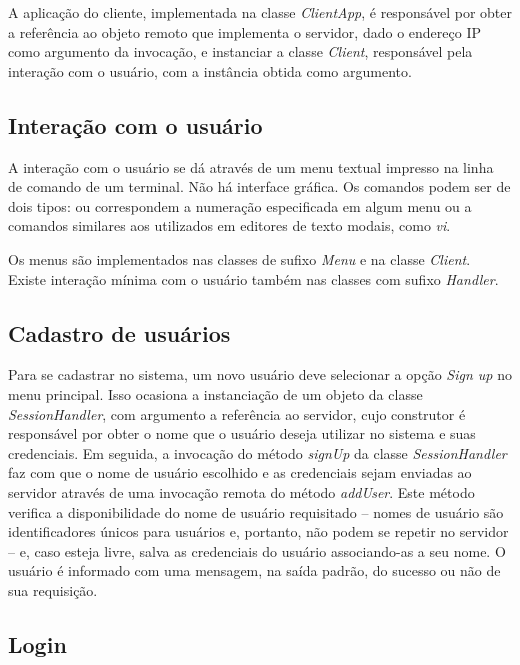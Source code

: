 \documentclass[../main.tex]{subfiles}
\begin{document}
A aplicação do cliente, implementada na classe \textit{ClientApp}, é responsável por obter a referência ao objeto remoto que implementa o servidor, dado o endereço IP como argumento da invocação, e instanciar a classe \textit{Client}, responsável pela interação com o usuário, com a instância obtida como argumento.

\subsection{Interação com o usuário}

A interação com o usuário se dá através de um menu textual impresso na linha de comando de um terminal.
Não há interface gráfica.
Os comandos podem ser de dois tipos: ou correspondem a numeração especificada em algum menu ou a comandos similares aos utilizados em editores de texto modais, como \textit{vi}.

Os menus são implementados nas classes de sufixo \textit{Menu} e na classe \textit{Client}.
Existe interação mínima com o usuário também nas classes com sufixo \textit{Handler}.

\subsection{Cadastro de usuários}

Para se cadastrar no sistema, um novo usuário deve selecionar a opção \textit{Sign up} no menu principal.
Isso ocasiona a instanciação de um objeto da classe \textit{SessionHandler}, com argumento a referência ao servidor, cujo construtor é responsável por obter o nome que o usuário deseja utilizar no sistema e suas credenciais.
Em seguida, a invocação do método \textit{signUp} da classe \textit{SessionHandler} faz com que o nome de usuário escolhido e as credenciais sejam enviadas ao servidor através de uma invocação remota do método \textit{addUser}.
Este método verifica a disponibilidade do nome de usuário requisitado -- nomes de usuário são identificadores únicos para usuários e, portanto, não podem se repetir no servidor -- e, caso esteja livre, salva as credenciais do usuário associando-as a seu nome.
O usuário é informado com uma mensagem, na saída padrão, do sucesso ou não de sua requisição.


\subsection{Login}
\end{document}

